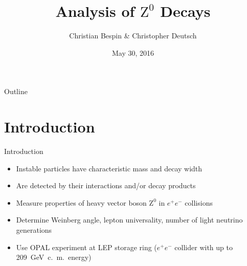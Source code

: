\documentclass[11pt,xcolor=dvipsnames,professionalfonts]{beamer}
\author[Christian Bespin \& Christopher Deutsch]
{Christian Bespin \& Christopher Deutsch}
\title
{Analysis of $\mathrm{Z}^0$ Decays}
\subtitle
{}
\institute[]
{Advanced Laboratory Course\\ Summer Term 16}
\date{May 30, 2016}
\begin{document}
\maketitle


\begin{frame}{Outline}
	\tableofcontents
\end{frame}

\section{Introduction}
\begin{frame}{Introduction}
		\begin{itemize}
			\setlength\itemsep{1em}
			\item Instable particles have characteristic mass and decay width
			\item Are detected by their interactions and/or decay products
			\item Measure properties of heavy vector boson $\mathrm{Z}^0$ in $e^+e^-$ collisions
			\item Determine Weinberg angle, lepton universality, number of light neutrino generations
			\item Use OPAL experiment at LEP storage ring ($e^+e^-$ collider with up to \SI{209}{GeV}~c.~m.~energy)
		\end{itemize}
\end{frame}
\end{document}

